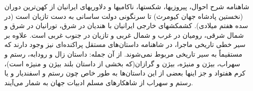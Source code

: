 \documentclass{article}
\begin{document}
\begin{tram}
\parbox{0.94\linewidth}{%
شاهنامه شرح احوال، پیروزیها، شکستها، ناکامیها و دلاوریهای ایرانیان از کهن‌ترین دوران (نخستین پادشاه جهان کیومرث) تا سرنگونی دولت ساسانی به دست تازیان است (در سده هفتم میلادی). کشمکشهای خارجی ایرانیان با هندیان در شرق، تورانیان در شرق و شمال شرقی، رومیان در غرب و شمال غربی و تازیان در جنوب غربی است. علاوه بر سیر خطی تاریخی ماجرا، در شاهنامه داستان‌های مستقل پراکنده‌ای نیز وجود دارند که مستقیماً به سیر تاریخی مربوط نمی‌شوند. از آن جمله: داستان زال و رودابه، رستم و سهراب، بیژن و منیژه، بیژن و گرازان(که بخشی از داستان بلند بیژن و منیژه است)، کرم هفتواد و جز اینها بعضی از این داستان‌ها به طور خاص چون رستم و اسفندیار و یا رستم و سهراب از شاهکارهای مسلم ادبیات جهان به شمار می‌آیند.
}
\end{tram}
\end{document}
